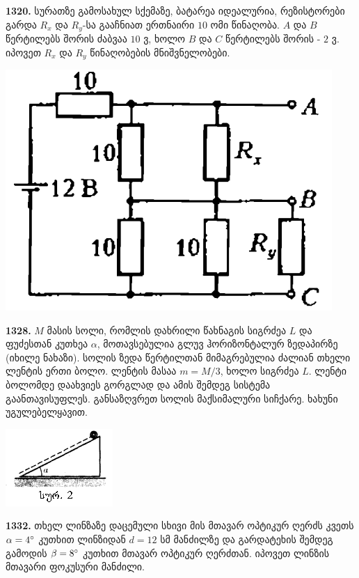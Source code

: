\documentclass[12pt,a4paper,]{report}
\begin{document}
\textbf{1320.} სურათზე გამოსახულ სქემაზე, ბატარეა იდეალურია, რეზისტორები გარდა $R_x$ და $R_y$-სა გააჩნიათ ერთნაირი $10$ ომი წინაღობა. $A$ და $B$ წერტილებს შორის ძაბვაა $10$ ვ, ხოლო $B$ და $C$ წერტილებს შორის - $2$ ვ. იპოვეთ $R_x$ და $R_y$ წინაღობების მნიშვნელობები.
		\begin{center}
			\includegraphics[scale=0.4]{images/F1320.png}
		\end{center}
	
\textbf{1328.} $M$ მასის სოლი, რომლის დახრილი წახნაგის სიგრძეა $L$ და ფუძესთან კუთხეა $\alpha$, მოთავსებულია გლუვ ჰორიზონტალურ ზედაპირზე (იხილე ნახაზი). სოლის ზედა წერტილთან მიმაგრებულია ძალიან თხელი ლენტის ერთი ბოლო. ლენტის მასაა $m=M/3$, ხოლო სიგრძეა $L$. ლენტი ბოლომდე დაახვიეს გორგლად და ამის შემდეგ სისტემა გაანთავისუფლეს. განსაზღვრეთ სოლის მაქსიმალური სიჩქარე. ხახუნი უგულებელყავით.                                                                   
		\begin{center}
			\includegraphics[scale=0.5]{images/F1328.png}
		\end{center}

\textbf{1332.} თხელ ლინზაზე დაცემული სხივი მის მთავარ ოპტიკურ ღერძს კვეთს $\alpha = 4 \degree$ კუთხით ლინზიდან $d=12$ სმ მანძილზე და გარდატეხის შემდეგ გამოდის $\beta = 8 \degree$ კუთხით მთავარ ოპტიკურ ღერძთან. იპოვეთ ლინზის მთავარი ფოკუსური მანძილი.
\end{document}
